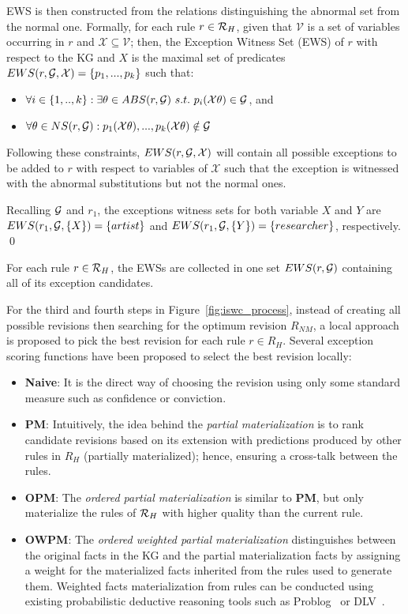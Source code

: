 EWS is then constructed from the relations distinguishing the abnormal set from the normal one. Formally, for each rule $r \in \mathcal{R}_H$, given that $\mathcal{V}$ is a set of variables occurring in $r$ and $\mathcal{X} \subseteq \mathcal{V}$; then, the Exception Witness Set (EWS) of $r$ with respect to the KG and $X$ is  the maximal set of predicates $EWS(r,\mathcal{G},\mathcal{X}) = \{p_1,...,p_k\}$ such that:
\begin{itemize}
\item $\forall i \in \{1,..,k\} : \exists \theta \in ABS(r, \mathcal{G})\ s.t.\ p_i(\mathcal{X}\theta) \in \mathcal{G}$, and 
\item $\forall \theta \in NS(r,\mathcal{G}) :  p_1(\mathcal{X}\theta), ...,p_k(\mathcal{X}\theta) \notin \mathcal{G}$
\end{itemize}

Following these constraints, $EWS(r,\mathcal{G},\mathcal{X})$ will contain all possible exceptions to be added to $r$ with respect to variables of $\mathcal{X}$ such that the exception is witnessed with the abnormal substitutions but not the normal ones.


\begin{example}
Recalling $\mathcal{G}$ and $r_1$, the exceptions witness sets for both variable $X$ and $Y$ are $EWS(r_1,\mathcal{G},\{X\}) = \{artist\}$ and $EWS(r_1,\mathcal{G},\{Y\}) = \{researcher\}$, respectively.
\qed
\end{example}
For each rule $r \in \mathcal{R}_H$, the EWSs are collected in one set $EWS(r,\mathcal{G})$ containing all of its exception candidates. 

For the third and fourth steps in Figure~\ref{fig:iswc_process}, instead of creating all possible revisions then searching for the optimum revision $R_{NM}$, a local approach is proposed to pick the best revision for each rule $r \in R_H$. Several exception scoring functions have been proposed to select the best revision locally:
\begin{itemize}
\item \textbf{Naive}: It is the direct way of choosing the revision using only some standard measure such as confidence or conviction.
\item \textbf{PM}: Intuitively, the idea behind the \textit{partial materialization} is to rank candidate revisions based on its extension with predictions produced by other rules in $R_H$ (\ie partially materialized); hence, ensuring a cross-talk between the rules.
\item \textbf{OPM}: The \textit{ordered partial materialization} is similar to \textbf{PM}, but only materialize the rules of $\mathcal{R}_{H}$ with higher quality than the current rule.
\item \textbf{OWPM}: The \textit{ordered weighted partial materialization} distinguishes between the original facts in the KG and the partial materialization facts by assigning a weight for the materialized facts inherited from the rules used to generate them. Weighted facts materialization from rules can be conducted using existing probabilistic deductive reasoning tools such as Problog~\cite{problog2007,problog2015} or DLV~\cite{dlv2006}.
\end{itemize}


 

